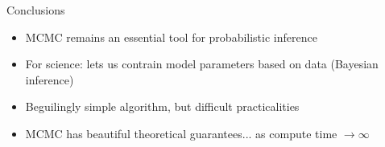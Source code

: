 \documentclass{beamer}
\newcommand{\dfmpage}[1]{
{
\setbeamercolor{background canvas}{bg=}

}
}
\begin{document}


\begin{frame}{Conclusions}
\begin{itemize}
  \addtolength{\itemsep}{0.5ex}%
\item MCMC remains an essential tool for probabilistic inference
\item For science: lets us contrain model parameters based on data (Bayesian inference)
\item Beguilingly simple algorithm, but difficult practicalities %
\item MCMC has beautiful theoretical guarantees... as compute time $\to \infty$
\end{itemize}
\end{frame}



\end{document}
